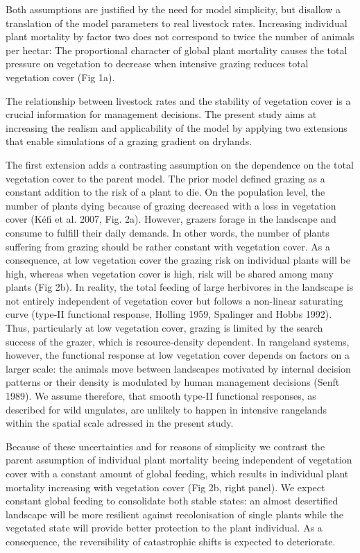 Both assumptions are justified by the need for model simplicity, but disallow a translation of the model parameters to real livestock rates. Increasing individual plant mortality by factor two does not correspond to twice the number of animals per hectar: The proportional character of global plant mortality causes the total pressure on vegetation to decrease when intensive grazing reduces total vegetation cover (Fig 1a).

The relationship between livestock rates and the stability of vegetation cover is a crucial information for management decisions. The present study aims at increasing the realism and applicability of the model by applying two extensions that enable simulations of a grazing gradient on drylands.

The first extension adds a contrasting assumption on the dependence on the total vegetation cover to the parent model. The prior model defined grazing as a constant addition to the risk of a plant to die. On the population level, the number of plants dying because of grazing decreased with a loss in vegetation cover (K\'efi et al. 2007, Fig. 2a). However, grazers forage in the landscape and consume to fulfill their daily demands. In other words, the number of plants suffering from grazing should be rather constant with vegetation cover. As a consequence, at low vegetation cover the grazing risk on individual plants will be high, whereas when vegetation cover is high, risk will be shared among many plants (Fig 2b).
In reality, the total feeding of large herbivores in the landscape is not entirely independent of vegetation cover but follows a non-linear saturating curve (type-II functional response, Holling 1959, Spalinger and Hobbs 1992). Thus, particularly at low vegetation cover, grazing is limited by the search success of the grazer, which is resource-density dependent. In rangeland systems, however, the functional response at low vegetation cover depends on factors on a larger scale: the animals move between landscapes motivated by internal decision patterns or their density is modulated by human management decisions (Senft 1989). We assume therefore, that smooth type-II functional responses, as described for wild ungulates, are unlikely to happen in intensive rangelands within the spatial scale adressed in the present study.

Because of these uncertainties and for reasons of simplicity we contrast the parent assumption of individual plant mortality beeing independent of vegetation cover with a constant amount of global feeding, which results in individual plant mortality increasing with vegetation cover (Fig 2b, right panel). We expect constant global feeding to consolidate both stable states: an almost desertified landscape will be more resilient against recolonisation of single plants while the vegetated state will provide better protection to the plant individual. As a consequence, the reversibility of catastrophic shifts is expected to deteriorate. 

